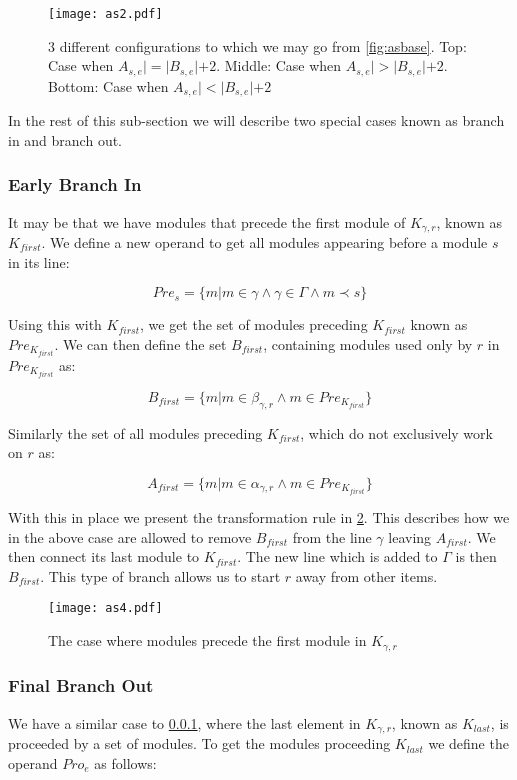 \begin{figure}[H]
\centering
\texttt{[image: as2.pdf]}
\caption{3 different configurations to which we may go from \cref{fig:asbase}. Top: Case when $A_{s,e}| = |B_{s,e}| + 2$. Middle: Case when $A_{s,e}| > |B_{s,e}| + 2$. Bottom: Case when $A_{s,e}| < |B_{s,e}| + 2$ }
\label{fig:astrans}
\end{figure}

In the rest of this sub-section we will describe two special cases known as branch in and branch out. 

\subsubsection{Early Branch In}\label{sssec:bi}
It may be that we have modules that precede the first module of $K_{\gamma ,r}$, known as $K_{first}$. We define a new operand to get all modules appearing before a module $s$ in its line:

\[Pre_{s} = \{m | m \in \gamma \land \gamma \in \Gamma \land m \prec s\}\]

Using this with $K_{first}$, we get the set of modules preceding $K_{first}$ known as $Pre_{K_{first}}$. We can then define the set $B_{first}$, containing modules used only by $r$ in $Pre_{K_{first}}$ as:

\[ B_{first} = \{m | m \in \beta_{\gamma ,r}  \land m \in Pre_{K_{first}} \} \]

Similarly the set of all modules preceding $K_{first}$, which do not exclusively work on $r$ as: 

\[ A_{first} = \{m | m \in \alpha_{\gamma ,r}  \land m \in Pre_{K_{first}} \} \]

With this in place we present the transformation rule in \cref{fig:asbranchin}. This describes how we in the above case are allowed to remove $B_{first}$ from the line $\gamma$ leaving  $A_{first}$. We then connect its last module to $K_{first}$. The new line which is added to $\Gamma$ is then $B_{first}$. This type of branch allows us to start $r$ away from other items.   


\begin{figure}[H]
\centering
\texttt{[image: as4.pdf]}
\caption{The case where modules precede the first module in $K_{\gamma ,r}$}
\label{fig:asbranchin}
\end{figure}

\subsubsection{Final Branch Out}
We have a similar case to \cref{sssec:bi}, where the last element in $K_{\gamma ,r}$, known as $K_{last}$, is proceeded by a set of modules. To get the modules proceeding $K_{last}$ we define the operand $Pro_{e}$ as follows:

